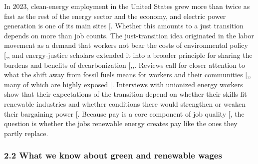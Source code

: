 \documentclass[
  11pt,
]{article}
\begin{document}
In 2023, clean-energy employment in the United States grew more than
twice as fast as the rest of the energy sector and the economy, and
electric power generation is one of its main sites
{[}\citeproc{ref-doe2024useer}{11}{]}. Whether this amounts to a just
transition depends on more than job counts. The just-transition idea
originated in the labor movement as a demand that workers not bear the
costs of environmental policy
{[},\citeproc{ref-ilo2014just}{12}{]},
and energy-justice scholars extended it into a broader principle for
sharing the burdens and benefits of decarbonization
{[},,\citeproc{ref-healy2017politicizing}{14}{]}.
Reviews call for closer attention to what the shift away from fossil
fuels means for workers and their communities
{[},\citeproc{ref-carley2020justice}{16}{]},
many of which are highly exposed
{[}\citeproc{ref-raimi2022mapping}{17}{]}. Interviews with unionized
energy workers show that their expectations of the transition depend on
whether their skills fit renewable industries and whether conditions
there would strengthen or weaken their bargaining power
{[}\citeproc{ref-sicotte2022necessary}{18}{]}. Because pay is a core
component of job quality {[}\citeproc{ref-kalleberg2011good}{19}{]}, the
question is whether the jobs renewable energy creates pay like the ones
they partly replace.

\subsubsection{2.2 What we know about green and renewable
wages}\label{what-we-know-about-green-and-renewable-wages}
\end{document}
